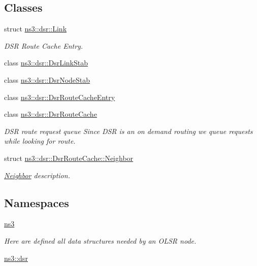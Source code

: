 \subsection*{Classes}
\begin{DoxyCompactItemize}
\item 
struct \hyperlink{structns3_1_1dsr_1_1Link}{ns3\+::dsr\+::\+Link}
\begin{DoxyCompactList}\small\item\em D\+SR Route Cache Entry. \end{DoxyCompactList}\item 
class \hyperlink{classns3_1_1dsr_1_1DsrLinkStab}{ns3\+::dsr\+::\+Dsr\+Link\+Stab}
\item 
class \hyperlink{classns3_1_1dsr_1_1DsrNodeStab}{ns3\+::dsr\+::\+Dsr\+Node\+Stab}
\item 
class \hyperlink{classns3_1_1dsr_1_1DsrRouteCacheEntry}{ns3\+::dsr\+::\+Dsr\+Route\+Cache\+Entry}
\item 
class \hyperlink{classns3_1_1dsr_1_1DsrRouteCache}{ns3\+::dsr\+::\+Dsr\+Route\+Cache}
\begin{DoxyCompactList}\small\item\em D\+SR route request queue Since D\+SR is an on demand routing we queue requests while looking for route. \end{DoxyCompactList}\item 
struct \hyperlink{structns3_1_1dsr_1_1DsrRouteCache_1_1Neighbor}{ns3\+::dsr\+::\+Dsr\+Route\+Cache\+::\+Neighbor}
\begin{DoxyCompactList}\small\item\em \hyperlink{structns3_1_1dsr_1_1DsrRouteCache_1_1Neighbor}{Neighbor} description. \end{DoxyCompactList}\end{DoxyCompactItemize}
\subsection*{Namespaces}
\begin{DoxyCompactItemize}
\item 
 \hyperlink{namespacens3}{ns3}
\begin{DoxyCompactList}\small\item\em Here are defined all data structures needed by an O\+L\+SR node. \end{DoxyCompactList}\item 
 \hyperlink{namespacens3_1_1dsr}{ns3\+::dsr}
\end{DoxyCompactItemize}
